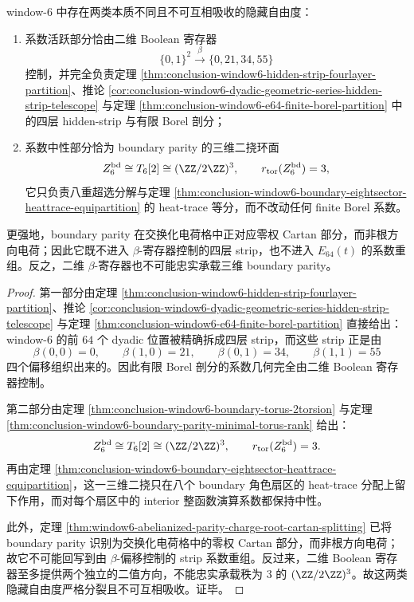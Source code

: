\begin{theorem}\label{thm:conclusion-window6-hidden-structure-two-plus-three-splitting}
window-\(6\) 中存在两类本质不同且不可互相吸收的隐藏自由度：
\begin{enumerate}
  \item 系数活跃部分恰由二维 Boolean 寄存器
  \[
  \{0,1\}^2\xrightarrow{\ \beta\ }\{0,21,34,55\}
  \]
  控制，并完全负责定理 \ref{thm:conclusion-window6-hidden-strip-fourlayer-partition}、推论 \ref{cor:conclusion-window6-dyadic-geometric-series-hidden-strip-telescope} 与定理 \ref{thm:conclusion-window6-e64-finite-borel-partition} 中的四层 hidden-strip 与有限 Borel 剖分；
  \item 系数中性部分恰为 boundary parity 的三维二挠环面
  \[
  Z_6^{\mathrm{bd}}\cong T_6[2]\cong (\ZZ/2\ZZ)^3,
\qquad
  r_{\mathrm{tor}}(Z_6^{\mathrm{bd}})=3,
  \]
  它只负责八重超选分解与定理 \ref{thm:conclusion-window6-boundary-eightsector-heattrace-equipartition} 的 heat-trace 等分，而不改动任何 finite Borel 系数。
\end{enumerate}
更强地，boundary parity 在交换化电荷格中正对应零权 Cartan 部分，而非根方向电荷；因此它既不进入 \(\beta\)-寄存器控制的四层 strip，也不进入 \(E_{64}(t)\) 的系数重组。反之，二维 \(\beta\)-寄存器也不可能忠实承载三维 boundary parity。
\end{theorem}
\begin{proof}
第一部分由定理 \ref{thm:conclusion-window6-hidden-strip-fourlayer-partition}、推论 \ref{cor:conclusion-window6-dyadic-geometric-series-hidden-strip-telescope} 与定理 \ref{thm:conclusion-window6-e64-finite-borel-partition} 直接给出：window-\(6\) 的前 \(64\) 个 dyadic 位置被精确拆成四层 strip，而这些 strip 正是由
\[
\beta(0,0)=0,\qquad
\beta(1,0)=21,\qquad
\beta(0,1)=34,\qquad
\beta(1,1)=55
\]
四个偏移组织出来的。因此有限 Borel 剖分的系数几何完全由二维 Boolean 寄存器控制。

第二部分由定理 \ref{thm:conclusion-window6-boundary-torus-2torsion} 与定理 \ref{thm:conclusion-window6-boundary-parity-minimal-torus-rank} 给出：
\[
Z_6^{\mathrm{bd}}\cong T_6[2]\cong (\ZZ/2\ZZ)^3,
\qquad
r_{\mathrm{tor}}(Z_6^{\mathrm{bd}})=3.
\]
再由定理 \ref{thm:conclusion-window6-boundary-eightsector-heattrace-equipartition}，这一三维二挠只在八个 boundary 角色扇区的 heat-trace 分配上留下作用，而对每个扇区中的 interior 整函数演算系数都保持中性。

此外，定理 \ref{thm:window6-abelianized-parity-charge-root-cartan-splitting} 已将 boundary parity 识别为交换化电荷格中的零权 Cartan 部分，而非根方向电荷；故它不可能回写到由 \(\beta\)-偏移控制的 strip 系数重组。反过来，二维 Boolean 寄存器至多提供两个独立的二值方向，不能忠实承载秩为 \(3\) 的 \((\ZZ/2\ZZ)^3\)。故这两类隐藏自由度严格分裂且不可互相吸收。证毕。
\end{proof}

